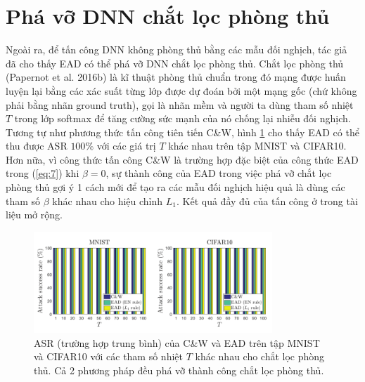 \section{Phá vỡ DNN chắt lọc phòng thủ}
Ngoài ra, để tấn công DNN không phòng thủ bằng các mẫu đối nghịch, tác giả đã cho thấy EAD có thể phá vỡ DNN chắt lọc phòng thủ. Chắt lọc phòng thủ (Papernot et al. 2016b) là kĩ thuật phòng thủ chuẩn trong đó mạng được huấn luyện lại bằng các xác suất từng lớp được dự đoán bởi một mạng gốc (chứ không phải bằng nhãn ground truth), gọi là nhãn mềm và người ta dùng tham số nhiệt $T$ trong lớp softmax để tăng cường sức mạnh của nó chống lại nhiễu đối nghịch. Tương tự như phương thức tấn công tiên tiến C\&W, hình \ref{fig:fg_03} cho thấy EAD có thể thu được ASR $100\%$ với các giá trị $T$ khác nhau trên tập MNIST và CIFAR10. Hơn nữa, vì công thức tấn công C\&W là trường hợp đặc biệt của công thức EAD trong (\ref{eq:7}) khi $\beta = 0$, sự thành công của EAD trong việc phá vỡ chắt lọc phòng thủ gợi ý 1 cách mới để tạo ra các mẫu đối nghịch hiệu quả là dùng các tham số  $\beta$ khác nhau cho hiệu chỉnh $L_1$. Kết quả đầy đủ của tấn công ở trong tài liệu mở rộng.

\begin{figure}[H] %
    \centering %
    \includegraphics[width=0.8\textwidth]{assets/fig_3.png} 
    \caption{ASR (trường hợp trung bình) của C\&W và EAD trên tập MNIST và CIFAR10 với các tham số nhiệt $T$ khác nhau cho chắt lọc phòng thủ. Cả 2 phương pháp đều phá vỡ thành công chắt lọc phòng thủ.} %
    \label{fig:fg_03}
\end{figure}